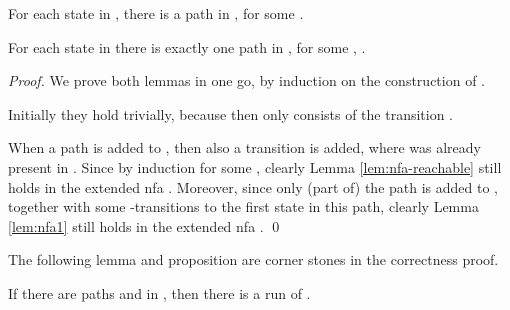 \documentclass{llncs}
\begin{document}
\begin{lemma}
\label{lem:nfa-reachable}
For each state  in , there is a path  in , for some .
\end{lemma}

\begin{lemma}
\label{lem:nfa1}
For each state  in  there is exactly one path  in , for some , .
\end{lemma}

\begin{proof}
We prove both lemmas in one go, by induction on the construction of .

Initially they hold trivially, because then  only consists of the transition .

When a path  is added to , then also a transition 
is added, where  was already present in . Since by induction  for some ,
clearly Lemma \ref{lem:nfa-reachable} still holds in the extended nfa .
Moreover, since only (part of) the path  is added to , together with some
-transitions to the first state in this path, clearly Lemma \ref{lem:nfa1} still holds in the extended nfa .
\qed
\end{proof}

\noindent
The following lemma and proposition are corner stones in the correctness proof.

\begin{lemma}
\label{lem:strengthening}
If there are paths  and  in , then there is a run  of .
\end{lemma}
\end{document}
